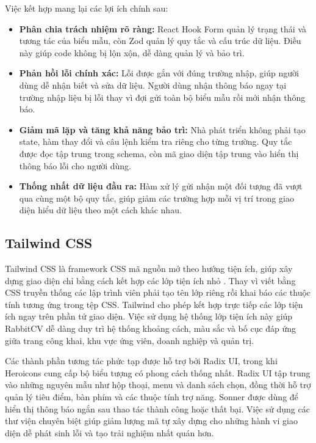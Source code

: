Việc kết hợp mang lại các lợi ích chính sau:

\begin{itemize}
    \item \textbf{Phân chia trách nhiệm rõ ràng:} React Hook Form quản lý trạng thái và tương tác của biểu mẫu, còn Zod quản lý quy tắc và cấu trúc dữ liệu. Điều này giúp code không bị lộn xộn, dễ dàng quản lý và bảo trì.

    \item \textbf{Phản hồi lỗi chính xác:} Lỗi được gắn với đúng trường nhập, giúp người dùng dễ nhận biết và sửa dữ liệu. Người dùng nhận thông báo ngay tại trường nhập liệu bị lỗi thay vì đợi gửi toàn bộ biểu mẫu rồi mới nhận thông báo.

    \item \textbf{Giảm mã lặp và tăng khả năng bảo trì:} Nhà phát triển không phải tạo state, hàm thay đổi và câu lệnh kiểm tra riêng cho từng trường. Quy tắc được đọc tập trung trong schema, còn mã giao diện tập trung vào hiển thị thông báo lỗi cho người dùng.

    \item \textbf{Thống nhất dữ liệu đầu ra:} Hàm xử lý gửi nhận một đối tượng đã vượt qua cùng một bộ quy tắc, giúp giảm các trường hợp mỗi vị trí trong giao diện hiểu dữ liệu theo một cách khác nhau.
\end{itemize}


\subsection{Tailwind CSS}

Tailwind CSS là framework CSS mã nguồn mở theo hướng tiện ích, giúp xây dựng giao diện chỉ bằng cách kết hợp các lớp tiện ích nhỏ \cite{tailwinddocs}. Thay vì viết bằng CSS truyền thống các lập trình viên phải tạo tên lớp riêng rồi khai báo các thuộc tính tương ứng trong tệp CSS. Tailwind cho phép kết hợp trực tiếp các lớp tiện ích ngay trên phần tử giao diện. Việc sử dụng hệ thống lớp tiện ích này giúp RabbitCV dễ dàng duy trì hệ thống khoảng cách, màu sắc và bố cục đáp ứng giữa trang công khai, khu vực ứng viên, doanh nghiệp và quản trị.

Các thành phần tương tác phức tạp được hỗ trợ bởi Radix UI, trong khi Heroicons cung cấp bộ biểu tượng có phong cách thống nhất. Radix UI tập trung vào những nguyên mẫu như hộp thoại, menu và danh sách chọn, đồng thời hỗ trợ quản lý tiêu điểm, bàn phím và các thuộc tính trợ năng. Sonner được dùng để hiển thị thông báo ngắn sau thao tác thành công hoặc thất bại. Việc sử dụng các thư viện chuyên biệt giúp giảm lượng mã tự xây dựng cho những hành vi giao diện dễ phát sinh lỗi và tạo trải nghiệm nhất quán hơn.

